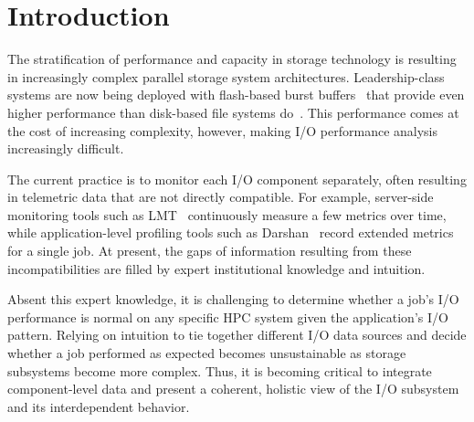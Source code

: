\section{Introduction} \label{sec:introduction}

The stratification of performance and capacity in storage technology is resulting in increasingly complex parallel storage system architectures.
Leadership-class systems are now being deployed with flash-based burst buffers~\cite{Henseler2016} that provide even higher performance than disk-based file systems do~\cite{Bhimji2016}.
This performance comes at the cost of increasing complexity, however, making I/O performance analysis increasingly difficult.

The current practice is to monitor each I/O component 
separately, often resulting in telemetric data that are not directly compatible.
For example, server-side monitoring tools such as LMT~\cite{lmt}
continuously measure a few metrics over time, while application-level
profiling tools such as Darshan~\cite{carns200924} record extended metrics
for a single job.
At present, the gaps of information resulting from these incompatibilities are filled by expert institutional knowledge and intuition.

Absent this expert knowledge, it is challenging to determine whether a job's I/O performance is normal on any specific HPC system given the application's I/O pattern.
Relying on intuition to tie together different I/O data sources and decide whether a job performed as expected becomes unsustainable as storage subsystems become more complex.  
Thus, it is becoming critical to integrate component-level data and present a coherent, holistic view of the I/O subsystem and its interdependent behavior.

